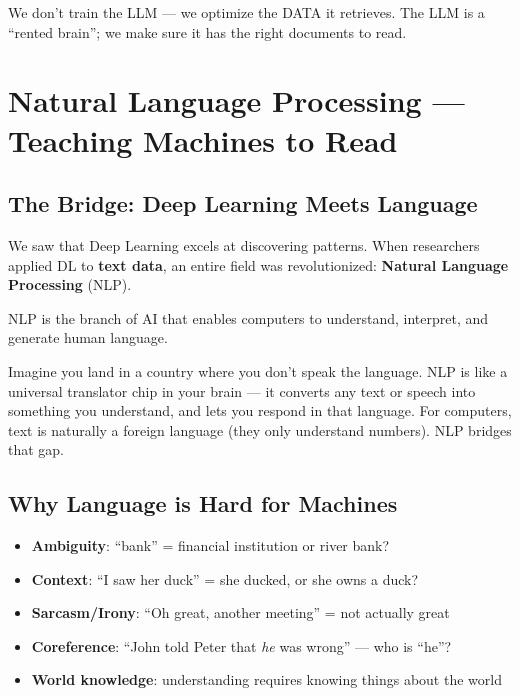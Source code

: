 \documentclass[11pt,a4paper]{report}
\begin{document}
\begin{projectbox}
We don't train the LLM --- we optimize the DATA it retrieves. The LLM is a ``rented brain''; we make sure it has the right documents to read.
\end{projectbox}

\chapter{Natural Language Processing --- Teaching Machines to Read}

\section{The Bridge: Deep Learning Meets Language}

We saw that Deep Learning excels at discovering patterns. When researchers applied DL to \textbf{text data}, an entire field was revolutionized: \textbf{Natural Language Processing} (NLP).

NLP is the branch of AI that enables computers to understand, interpret, and generate human language.

\begin{analogybox}
Imagine you land in a country where you don't speak the language. NLP is like a universal translator chip in your brain --- it converts any text or speech into something you understand, and lets you respond in that language. For computers, text is naturally a foreign language (they only understand numbers). NLP bridges that gap.
\end{analogybox}

\section{Why Language is Hard for Machines}

\begin{itemize}
    \item \textbf{Ambiguity}: ``bank'' = financial institution or river bank?
    \item \textbf{Context}: ``I saw her duck'' = she ducked, or she owns a duck?
    \item \textbf{Sarcasm/Irony}: ``Oh great, another meeting'' = not actually great
    \item \textbf{Coreference}: ``John told Peter that \textit{he} was wrong'' --- who is ``he''?
    \item \textbf{World knowledge}: understanding requires knowing things about the world
\end{itemize}
\end{document}
